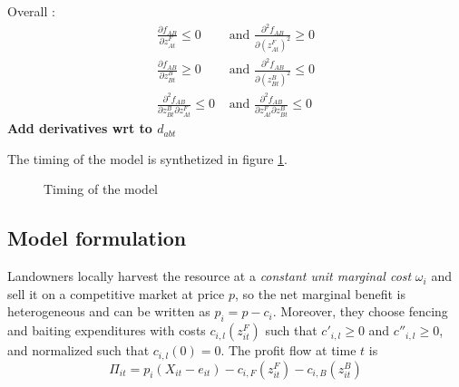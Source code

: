 \documentclass{article}
\begin{document}
 Overall : 
\begin{align*}
    \frac{\partial f_{AB}}{\partial z^F_{At}}\leq 0 &\text{ and } \frac{\partial^2 f_{AB}}{\partial (z^F_{At})^2} \geq 0\\
    \frac{\partial f_{AB}}{\partial z^B_{Bt}}\geq 0 &\text{ and } \frac{\partial^2 f_{AB}}{\partial (z^B_{Bt})^2} \leq 0\\
    \frac{\partial ^2 f_{AB}}{\partial z_{Bt}^B\partial z_{At}^F} \leq 0 &\text{ and } \frac{\partial ^2 f_{AB}}{\partial z_{At}^F\partial z_{Bt}^B} \leq 0
\end{align*}
\textbf{Add derivatives wrt to $d_{abt}$}


The timing of the model is synthetized in figure \ref{fig:timing}.

\begin{figure}[H]
  \centering
  \caption{Timing of the model}
  \label{fig:timing}
\end{figure}


\subsection{Model formulation}
Landowners locally harvest the resource at a \textit{constant unit marginal cost} $\omega_i$ and sell it on a competitive market at price $p$, so the net marginal benefit is heterogeneous and can be written as $p_i = p - c_i$. Moreover, they choose fencing and baiting expenditures with costs $c_{i,l}(z_{it}^F)$ such that $c'_{i,l}\geq 0$ and $c''_{i,l} \geq 0$, and normalized such that $c_{i,l}(0) = 0$. The profit flow at time $t$ is
\begin{equation}
    \Pi_{it} = p_i(X_{it} - e_{it}) - c_{i,F}(z_{it}^F) - c_{i,B}(z_{it}^B)
\end{equation}
\end{document}

